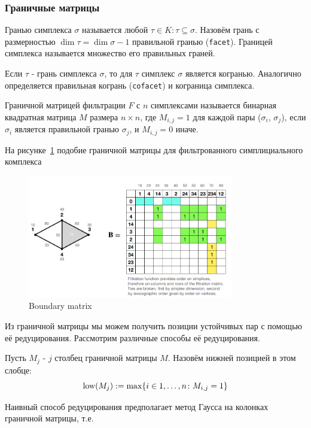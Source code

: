 \documentclass{article}
\begin{document}
\subsubsection{Граничные матрицы}
\begin{definition}
  Гранью симплекса $\sigma$ называется любой $\tau\in K\colon \tau\subseteq \sigma$. Назовём грань с размерностью $\dim \tau = \dim \sigma - 1$ правильной гранью (\texttt{facet}). Границей симплекса называется множество его правильных граней.
\end{definition}
\begin{definition}
  Если $\tau$ - грань симплекса $\sigma$, то для $\tau$ симплекс $\sigma$ является когранью. Аналогично определяется правильная когрань (\texttt{cofacet}) и кограница симплекса.
\end{definition}
\begin{definition}
  Граничной матрицей фильтрации $F$ с $n$ симплексами называется бинарная квадратная матрица $M$ размера $n\times n$, где $M_{i,j}=1$ для каждой пары ($\sigma_i$, $\sigma_j$), если $\sigma_i$ является правильной гранью $\sigma_j$, и $M_{i,j}=0$ иначе.
\end{definition}
\begin{example}
  На рисунке~\ref{fig:boundary_matrix} подобие граничной матрицы для фильтрованного симплициального комплекса

\begin{figure}[ht]
  \centering
  \includegraphics[width=0.8\textwidth]{images/boundary_matrix.png}
  \caption{Boundary matrix}
  \label{fig:boundary_matrix}
\end{figure}
\end{example}
Из граничной матрицы мы можем получить позиции устойчивых пар с помощью её редуцирования. Рассмотрим различные способы её редуцирования.
\begin{definition}
  Пусть $M_j$ - $j$ столбец граничной матрицы $M$. Назовём нижней позицией в этом слобце:
  \[\mathop{\rm low}(M_j) := \max\{i \in 1,\dots,n\colon M_{i,j} = 1\}\]
\end{definition}
Наивный способ редуцирования предполагает метод Гаусса на колонках граничной матрицы, т.е.
\end{document}

